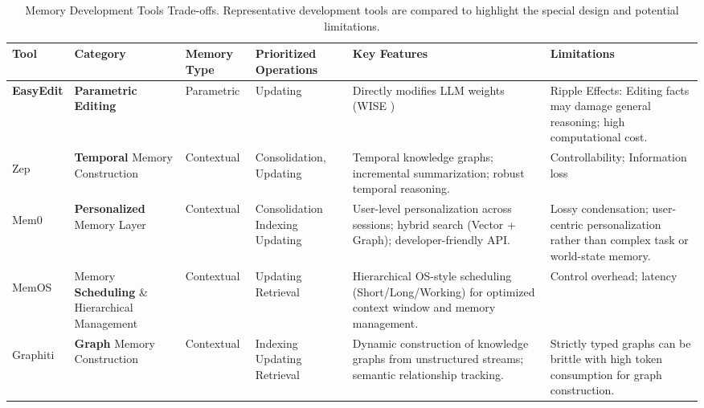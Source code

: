 \documentclass[manuscript,screen]{acmart}
\begin{document}
\begin{table}[t]
\centering
\small
\setlength{\tabcolsep}{3pt}
\renewcommand{\arraystretch}{1.2}
\caption{Memory Development Tools Trade-offs. Representative development tools are compared to highlight the special design and potential limitations.}
\begin{tabular}{@{}>{\bfseries}p{1.2cm}
                >{\raggedright\arraybackslash}p{2cm}
                >{\centering\arraybackslash}p{1.5cm}
                >{\raggedright\arraybackslash}p{1.5cm}
                >{\raggedright\arraybackslash}p{4cm}
                p{3cm}@{}}
\toprule
\textbf{Tool} & \textbf{Category} & \textbf{Memory Type} & \textbf{Prioritized Operations} & \textbf{Key Features} & \textbf{Limitations} \\ 
\midrule

EasyEdit \citep{wang-etal-2024-easyedit} &
 \textbf{Parametric Editing} &
Parametric &
Updating &
Directly modifies LLM weights (WISE \citep{wang2024wise}) &
Ripple Effects: Editing facts may damage general reasoning; high computational cost. \\
\midrule

Zep \newline \citep{rasmussen2025zep} &
\textbf{Temporal} Memory Construction &
Contextual &
Consolidation, Updating &
Temporal knowledge graphs; incremental summarization; robust temporal reasoning. &
Controllability; Information loss \\
\midrule

Mem0 \citep{mem0} &
\textbf{Personalized} Memory Layer &
Contextual &
Consolidation \newline Indexing \newline Updating &
User-level personalization across sessions; hybrid search (Vector + Graph); developer-friendly API. &
Lossy condensation; user-centric personalization rather than complex task or world-state memory. \\
\midrule

MemOS \citep{li2025memos} &
Memory \textbf{Scheduling} \& Hierarchical Management &
Contextual  &
Updating \newline Retrieval & Hierarchical OS-style scheduling (Short/Long/Working) for optimized context window and memory management. &
Control overhead; latency \\
\midrule

Graphiti \citep{he2025graphiti} &
\textbf{Graph} Memory Construction &
Contextual &
Indexing \newline Updating \newline Retrieval &
Dynamic construction of knowledge graphs from unstructured streams; semantic relationship tracking. &
Strictly typed graphs can be brittle with high token consumption for graph construction. \\


\end{tabular}
\end{table}
\end{document}

